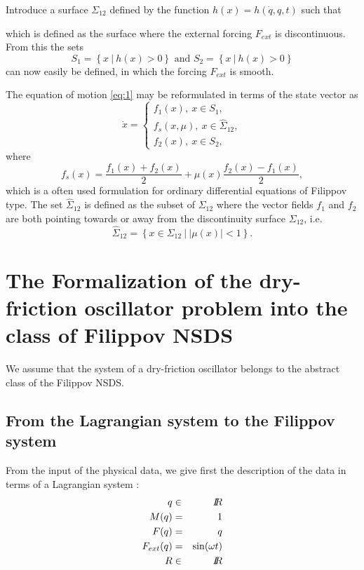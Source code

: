 \documentclass[10pt]{article}
\begin{document}
Introduce a surface $\Sigma_{12}$ defined by the function $h(x)=h(\dot{q},q,t)$ such that

which is defined as the surface where the external forcing $F_{ext}$ is discontinuous. From this the sets
\begin{equation}
S_1 = \left\{x \ | \ h(x) > 0 \right\} \text{ and } S_2 = \left\{x \ | \ h(x) > 0 \right\}
\end{equation}
can now easily be defined, in which the forcing $F_{ext}$ is smooth. 

The equation of motion \eqref{eq:1} may be reformulated in terms of the state vector as
\begin{equation}
  \label{eq:2}
\dot x =\left\{\begin{array}{l} 
        f_1(x), \ x \in S_1, \\
        f_s(x,\mu), \ x \in \hat{\Sigma}_{12},\\
        f_2(x), \ x \in S_2,
\end{array}\right.
\end{equation}
where
\begin{equation}
f_s(x) = \frac{f_1(x)+f_2(x)}{2}+ \mu(x)\frac{f_2(x)-f_1(x)}{2},
\label{eq:sliding_v_field}
\end{equation}
which is a often used formulation for ordinary differential equations of Filippov type. The set $\hat{\Sigma}_{12}$ is defined as the subset of $\Sigma_{12}$ where the vector fields $f_1$ and $f_2$ are both pointing towards or away from the discontinuity surface $\Sigma_{12}$, i.e.
\begin{equation}
\hat{\Sigma}_{12} = 
\left\{x \in \Sigma_{12} \ | \
        \left|\mu(x)
        \right| < 1
\right\}.
\end{equation}



 
\section{The Formalization of the dry-friction oscillator problem into the class of Filippov NSDS}
We assume that the system of a dry-friction oscillator belongs to the abstract class of the Filippov NSDS. 




\subsection{From the Lagrangian system to the Filippov system}


From the input of the physical data, we give first the description of the data in terms of a Lagrangian system :
\begin{eqnarray}
  q &\in & \mbox{\rm $I\!\!R$}  \\
  M(q)&=&1 \\
  F(q) &=& q  \\
  F_{ext}(q) &= &\sin(\omega t)\\
  R &\in & \mbox{\rm $I\!\!R$}  
\end{eqnarray}
\end{document}

